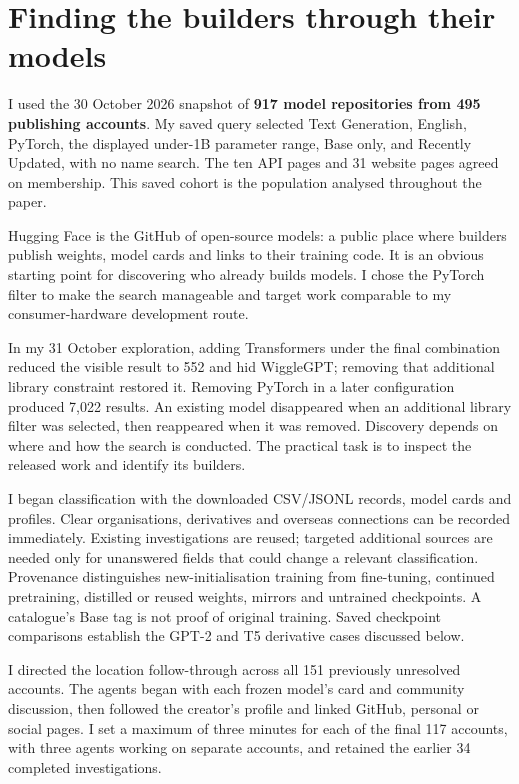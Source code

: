 \section{Finding the builders through their models}
I used the 30 October 2026 snapshot of \textbf{917 model repositories from
495 publishing accounts}. My saved query selected Text Generation,
English, PyTorch, the displayed under-1B parameter range, Base only, and
Recently Updated, with no name search. The ten API pages and 31 website
pages agreed on membership. This saved cohort is the population analysed
throughout the paper.

Hugging Face is the GitHub of open-source models: a public place where
builders publish weights, model cards and links to their training code.
It is an obvious starting point for discovering who already builds models.
I chose the PyTorch filter to make the search manageable and target
work comparable to my consumer-hardware development route.

In my 31 October exploration, adding Transformers under the final
combination reduced the visible result to 552 and hid WiggleGPT; removing
that additional library constraint restored it. Removing PyTorch in a
later configuration produced 7,022
results. An existing model disappeared when an additional library filter
was selected, then reappeared when it was removed. Discovery depends on
where and how the search is conducted. The practical task is to inspect
the released work and identify its builders.

I began classification with the downloaded CSV/JSONL records, model cards and
profiles. Clear organisations, derivatives and overseas connections can be
recorded immediately. Existing investigations are reused; targeted additional
sources are needed only for unanswered fields that could change a relevant
classification. Provenance distinguishes new-initialisation training from
fine-tuning, continued pretraining, distilled or reused weights, mirrors and
untrained checkpoints. A catalogue's Base tag is not proof of original
training. Saved checkpoint comparisons establish the GPT-2 and T5 derivative
cases discussed below.

I directed the location follow-through across all 151 previously unresolved
accounts. The agents began with each frozen model's card and community
discussion, then followed the creator's profile and linked GitHub, personal
or social pages. I set a maximum of three minutes for each of the final
117 accounts, with three agents working on separate accounts, and retained
the earlier 34 completed investigations.


